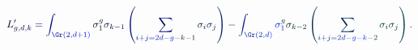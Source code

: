 \documentclass[12pt]{article}
\begin{document}
\makeatletter
\renewcommand*{\@textcolor}[3]{%
  \protect\leavevmode
  \begingroup
    \color#1{#2}#3%
  \endgroup
}
\makeatother
\begin{displaymath}
\mathcolor[RGB]{0,0,15}{L} _ { \mathcolor[RGB]{0,0,30}{g} \mathcolor[RGB]{0,0,45}{,} \mathcolor[RGB]{0,0,60}{d} \mathcolor[RGB]{0,0,75}{,} \mathcolor[RGB]{0,0,90}{k} } ^ { \mathcolor[RGB]{0,0,105}{\prime} } \mathcolor[RGB]{0,0,120}{=} \mathcolor[RGB]{0,0,135}{\int} _ { \mathcolor[RGB]{0,0,150}{\Gr} \mathcolor[RGB]{0,0,165}{(} \mathcolor[RGB]{0,0,180}{2} \mathcolor[RGB]{0,0,195}{,} \mathcolor[RGB]{0,0,210}{d} \mathcolor[RGB]{0,0,225}{+} \mathcolor[RGB]{0,0,240}{1} \mathcolor[RGB]{0,0,255}{)} } \mathcolor[RGB]{0,15,0}{\sigma} _ { \mathcolor[RGB]{0,15,15}{1} } ^ { \mathcolor[RGB]{0,15,30}{g} } \mathcolor[RGB]{0,15,45}{\sigma} _ { \mathcolor[RGB]{0,15,60}{k} \mathcolor[RGB]{0,15,75}{-} \mathcolor[RGB]{0,15,90}{1} } \mathcolor[RGB]{0,15,105}{\left(} \mathcolor[RGB]{0,15,120}{\sum} _ { \mathcolor[RGB]{0,15,135}{i} \mathcolor[RGB]{0,15,150}{+} \mathcolor[RGB]{0,15,165}{j} \mathcolor[RGB]{0,15,180}{=} \mathcolor[RGB]{0,15,195}{2} \mathcolor[RGB]{0,15,210}{d} \mathcolor[RGB]{0,15,225}{-} \mathcolor[RGB]{0,15,240}{g} \mathcolor[RGB]{0,15,255}{-} \mathcolor[RGB]{0,30,0}{k} \mathcolor[RGB]{0,30,15}{-} \mathcolor[RGB]{0,30,30}{1} } \mathcolor[RGB]{0,30,45}{\sigma} _ { \mathcolor[RGB]{0,30,60}{i} } \mathcolor[RGB]{0,30,75}{\sigma} _ { \mathcolor[RGB]{0,30,90}{j} } \mathcolor[RGB]{0,30,105}{\right)} \mathcolor[RGB]{0,30,120}{-} \mathcolor[RGB]{0,30,135}{\int} _ { \mathcolor[RGB]{0,30,150}{\Gr} \mathcolor[RGB]{0,30,165}{(} \mathcolor[RGB]{0,30,180}{2} \mathcolor[RGB]{0,30,195}{,} \mathcolor[RGB]{0,30,210}{d} \mathcolor[RGB]{0,30,225}{)} } \mathcolor[RGB]{0,30,240}{\sigma} _ { \mathcolor[RGB]{0,30,255}{1} } ^ { \mathcolor[RGB]{0,45,0}{g} } \mathcolor[RGB]{0,45,15}{\sigma} _ { \mathcolor[RGB]{0,45,30}{k} \mathcolor[RGB]{0,45,45}{-} \mathcolor[RGB]{0,45,60}{2} } \mathcolor[RGB]{0,45,75}{\left(} \mathcolor[RGB]{0,45,90}{\sum} _ { \mathcolor[RGB]{0,45,105}{i} \mathcolor[RGB]{0,45,120}{+} \mathcolor[RGB]{0,45,135}{j} \mathcolor[RGB]{0,45,150}{=} \mathcolor[RGB]{0,45,165}{2} \mathcolor[RGB]{0,45,180}{d} \mathcolor[RGB]{0,45,195}{-} \mathcolor[RGB]{0,45,210}{g} \mathcolor[RGB]{0,45,225}{-} \mathcolor[RGB]{0,45,240}{k} \mathcolor[RGB]{0,45,255}{-} \mathcolor[RGB]{0,60,0}{2} } \mathcolor[RGB]{0,60,15}{\sigma} _ { \mathcolor[RGB]{0,60,30}{i} } \mathcolor[RGB]{0,60,45}{\sigma} _ { \mathcolor[RGB]{0,60,60}{j} } \mathcolor[RGB]{0,60,75}{\right)} \mathcolor[RGB]{0,60,90}{.}
\end{displaymath}
\end{document}
